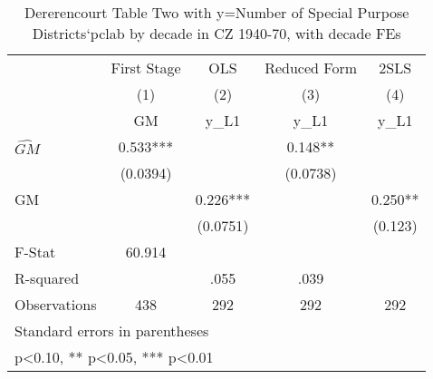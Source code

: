 \begin{table}[htbp]\centering
\def\sym#1{\ifmmode^{#1}\else\(^{#1}\)\fi}
\caption{Dererencourt Table Two with y=Number of Special Purpose Districts`pclab by decade in CZ 1940-70, with decade FEs}
\begin{tabular}{l*{4}{c}}
\toprule
                    & First Stage   &         OLS   &Reduced Form   &        2SLS   \\
                    &\multicolumn{1}{c}{(1)}&\multicolumn{1}{c}{(2)}&\multicolumn{1}{c}{(3)}&\multicolumn{1}{c}{(4)}\\
                    &\multicolumn{1}{c}{GM}&\multicolumn{1}{c}{y\_L1}&\multicolumn{1}{c}{y\_L1}&\multicolumn{1}{c}{y\_L1}\\
\midrule
$\hat{GM}$          &       0.533***&               &       0.148** &               \\
                    &    (0.0394)   &               &    (0.0738)   &               \\
\addlinespace
GM                  &               &       0.226***&               &       0.250** \\
                    &               &    (0.0751)   &               &     (0.123)   \\
\midrule
F-Stat              &      60.914   &               &               &               \\
R-squared           &               &        .055   &        .039   &               \\
Observations        &         438   &         292   &         292   &         292   \\
\bottomrule
\multicolumn{5}{l}{\footnotesize Standard errors in parentheses}\\
\multicolumn{5}{l}{\footnotesize * p<0.10, ** p<0.05, *** p<0.01}\\
\end{tabular}
\end{table}
